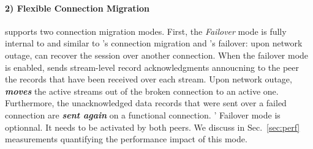 
\paragraph*{2) Flexible Connection Migration} \tcpls supports two connection migration modes. First, the \textit{Failover} mode is fully internal to \tcpls and similar to \quic's connection migration and \mptcp's failover:
upon network outage, \tcpls can recover the session over another \tcp
connection. When the failover mode is enabled, \tcpls sends stream-level record
acknowledgments annoucning to the peer the records that have been received
over each stream.  Upon network outage, \tcpls \textbf{\textit{moves}} the
active streams out of the broken \tcp connection to an active one. Furthermore,
the unacknowledged data records that were sent over a failed \tcp connection are
\textbf{\textit{sent again}} on a functional \tcp connection.
\tcpls' Failover mode is optionnal. It needs to be activated by both peers.  We
discuss in Sec.~\ref{sec:perf} measurements quantifying the performance impact
of this mode.

